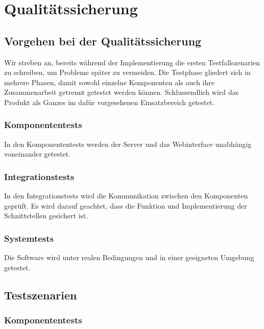 \chapter{Qualitätssicherung}
\section{Vorgehen bei der Qualitätssicherung}

Wir streben an, bereits während der Implementierung die ersten Testfallszenarien zu schreiben, um Probleme später zu vermeiden. Die Testphase gliedert sich in mehrere Phasen, damit sowohl einzelne Komponenten als auch ihre Zusammenarbeit getrennt getestet werden können. Schlussendlich wird das Produkt als Ganzes im dafür vorgesehenen Einsatzbereich getestet.

\subsection{Komponententests}
In den Komponententests werden der Server und das Webinterface unabhängig voneinander getestet.

\subsection{Integrationstests}
In den Integrationstests wird die Kommunikation zwischen den Komponenten geprüft. Es wird darauf geachtet, dass die Funktion und Implementierung der Schnittstellen gesichert ist.

\subsection{Systemtests}
Die Software wird unter realen Bedingungen und in einer geeigneten Umgebung getestet.

\section{Testszenarien}

\subsection{Komponententests}
